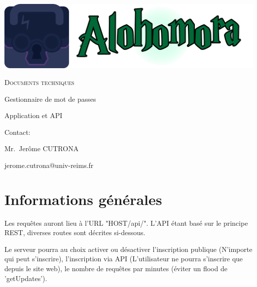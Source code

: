 \documentclass[oneside]{report}
\author{Sylvain COMBRAQUE, Sarah LAMOTTE, Nathan JANCZEWSKI, Léo BERGEROT}
\begin{document}
	\begin{titlepage}
		\centering
		\includegraphics[scale=.125]{logo_large}
		\vspace{5cm}
		{\par\scshape\Huge Documents techniques\par}
		\vspace{5cm}
		{\par Gestionnaire de mot de passes\par}
		{\par Application et API\par}
		\vfill
		\par Contact:
		{\par\small Mr.\ Jerôme CUTRONA \par}
		\par jerome.cutrona@univ-reims.fr\
	\end{titlepage}

	\pagestyle{fancy}
	\fancyhf{}
	\tableofcontents

	\chapter{Informations générales}
	\vspace{2cm}
	\par Les requêtes auront lieu à l'URL "HOST/api/". L'API étant basé sur le principe REST, diverses routes sont décrites si-dessous.\\
	\par Le serveur pourra au choix activer ou désactiver l'inscription publique (N'importe qui peut s'inscrire), l'inscription via API (L'utilisateur ne pourra s'inscrire que depuis le site web), le nombre de requêtes par minutes (éviter un flood de 'getUpdates').\\
\end{document}
